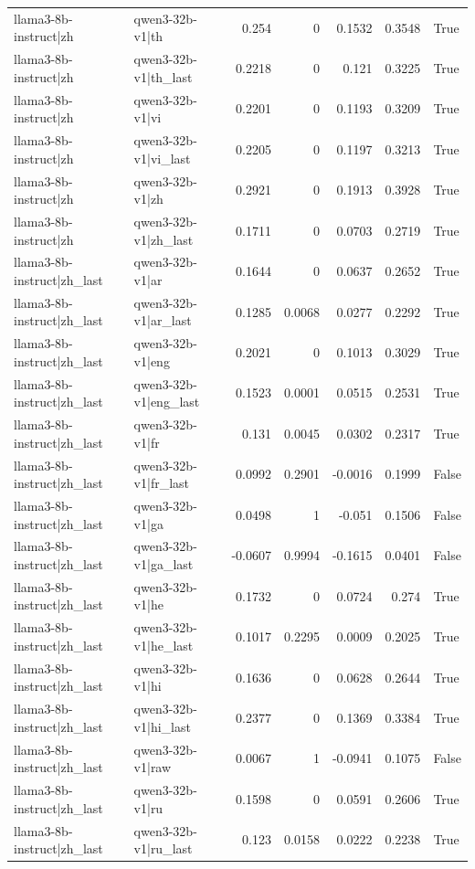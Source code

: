 \begin{table}
\begin{tabular}{l l r r r r l}
llama3-8b-instruct|zh & qwen3-32b-v1|th & 0.254 & 0 & 0.1532 & 0.3548 & True \\
llama3-8b-instruct|zh & qwen3-32b-v1|th_last & 0.2218 & 0 & 0.121 & 0.3225 & True \\
llama3-8b-instruct|zh & qwen3-32b-v1|vi & 0.2201 & 0 & 0.1193 & 0.3209 & True \\
llama3-8b-instruct|zh & qwen3-32b-v1|vi_last & 0.2205 & 0 & 0.1197 & 0.3213 & True \\
llama3-8b-instruct|zh & qwen3-32b-v1|zh & 0.2921 & 0 & 0.1913 & 0.3928 & True \\
llama3-8b-instruct|zh & qwen3-32b-v1|zh_last & 0.1711 & 0 & 0.0703 & 0.2719 & True \\
llama3-8b-instruct|zh_last & qwen3-32b-v1|ar & 0.1644 & 0 & 0.0637 & 0.2652 & True \\
llama3-8b-instruct|zh_last & qwen3-32b-v1|ar_last & 0.1285 & 0.0068 & 0.0277 & 0.2292 & True \\
llama3-8b-instruct|zh_last & qwen3-32b-v1|eng & 0.2021 & 0 & 0.1013 & 0.3029 & True \\
llama3-8b-instruct|zh_last & qwen3-32b-v1|eng_last & 0.1523 & 0.0001 & 0.0515 & 0.2531 & True \\
llama3-8b-instruct|zh_last & qwen3-32b-v1|fr & 0.131 & 0.0045 & 0.0302 & 0.2317 & True \\
llama3-8b-instruct|zh_last & qwen3-32b-v1|fr_last & 0.0992 & 0.2901 & -0.0016 & 0.1999 & False \\
llama3-8b-instruct|zh_last & qwen3-32b-v1|ga & 0.0498 & 1 & -0.051 & 0.1506 & False \\
llama3-8b-instruct|zh_last & qwen3-32b-v1|ga_last & -0.0607 & 0.9994 & -0.1615 & 0.0401 & False \\
llama3-8b-instruct|zh_last & qwen3-32b-v1|he & 0.1732 & 0 & 0.0724 & 0.274 & True \\
llama3-8b-instruct|zh_last & qwen3-32b-v1|he_last & 0.1017 & 0.2295 & 0.0009 & 0.2025 & True \\
llama3-8b-instruct|zh_last & qwen3-32b-v1|hi & 0.1636 & 0 & 0.0628 & 0.2644 & True \\
llama3-8b-instruct|zh_last & qwen3-32b-v1|hi_last & 0.2377 & 0 & 0.1369 & 0.3384 & True \\
llama3-8b-instruct|zh_last & qwen3-32b-v1|raw & 0.0067 & 1 & -0.0941 & 0.1075 & False \\
llama3-8b-instruct|zh_last & qwen3-32b-v1|ru & 0.1598 & 0 & 0.0591 & 0.2606 & True \\
llama3-8b-instruct|zh_last & qwen3-32b-v1|ru_last & 0.123 & 0.0158 & 0.0222 & 0.2238 & True \\

\end{tabular}
\end{table}

